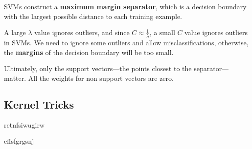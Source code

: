 SVMs construct a \textbf{maximum margin separator}, which is a decision boundary with the
largest possible distance to each training example.

A large $\lambda$ value ignores outliers, and since $C \approx \frac{1}{\lambda}$,
a small $C$ value ignores outliers in SVMs. We need to ignore some outliers and allow
misclassifications, otherwise, the \textbf{margins} of the decision boundary will be too small.

Ultimately, only the support vectors---the points closest to the separator---matter.
All the weights for non support vectors are zero.

\subsection{Kernel Tricks}
retnfsiwugirw

effsfgrgsnj